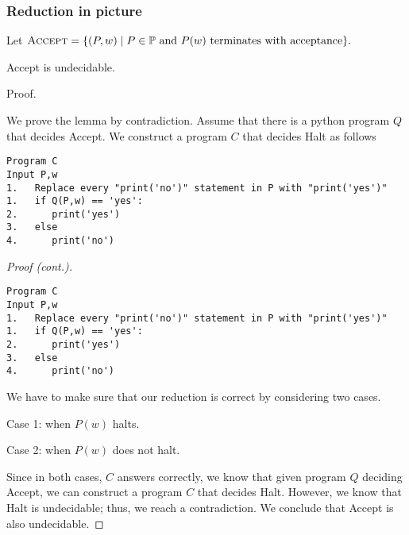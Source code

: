 \begin{frame}
  \frametitle{Reduction in picture}
\end{frame}

\begin{frame}[fragile=true]
  
  {\small
    Let $\textsc{Accept} = \{(P,w) \;|\;
    \mbox{$P\in{\mathbb P}$ and $P(w)$ terminates with acceptance}\}.$
  }
  
  \begin{lemma}
    {\sc Accept} is undecidable.
  \end{lemma}
  \begin{block}{Proof.}

      We prove the lemma by contradiction.  Assume that there is a
      python program $Q$ that decides {\sc Accept}. \pause We
      construct a program $C$ that decides {\sc Halt} as follows \pause
      
      {\footnotesize
\begin{verbatim}
Program C       
Input P,w       
1.   Replace every "print('no')" statement in P with "print('yes')"
1.   if Q(P,w) == 'yes':
2.      print('yes')
3.   else
4.      print('no')
\end{verbatim}
      }

  \end{block}
\end{frame}

\begin{frame}[fragile=true]
  \begin{proof}[Proof (cont.)]
    {\footnotesize
\begin{verbatim}
Program C       
Input P,w       
1.   Replace every "print('no')" statement in P with "print('yes')"
1.   if Q(P,w) == 'yes':
2.      print('yes')
3.   else
4.      print('no')
\end{verbatim}
    }   
    {\small
      We have to make sure that our reduction is correct by considering
      two cases.
      
      Case 1: when $P(w)$ halts. \pause

      Case 2: when $P(w)$ does not halt. \pause

      Since in both cases, $C$ answers correctly, we know that given
      program $Q$ deciding {\sc Accept}, we can construct a program
      $C$ that decides {\sc Halt}.  However, we know that {\sc Halt}
      is undecidable; thus, we reach a contradiction.  We conclude
      that {\sc Accept} is also undecidable.  }
  \end{proof}
\end{frame}

